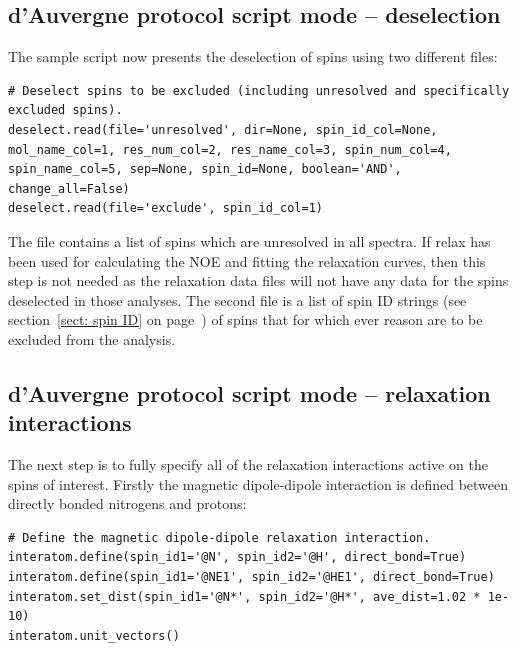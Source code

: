 \begin{htmlonly}
\begin{htmlonly}

\subsection{d'Auvergne protocol script mode -- deselection}

The sample script now presents the deselection of spins using two different files:

\begin{lstlisting}[firstnumber=188]
# Deselect spins to be excluded (including unresolved and specifically excluded spins).
deselect.read(file='unresolved', dir=None, spin_id_col=None, mol_name_col=1, res_num_col=2, res_name_col=3, spin_num_col=4, spin_name_col=5, sep=None, spin_id=None, boolean='AND', change_all=False)
deselect.read(file='exclude', spin_id_col=1)
\end{lstlisting}

The  file contains a list of spins which are unresolved in all spectra.  If relax has been used for calculating the NOE and fitting the relaxation curves, then this step is not needed as the relaxation data files will not have any data for the spins deselected in those analyses.  The second file  is a list of spin ID strings (see section~\ref{sect: spin ID} on page~\pageref{sect: spin ID}) of spins that for which ever reason are to be excluded from the analysis.



\subsection{d'Auvergne protocol script mode -- relaxation interactions}

The next step is to fully specify all of the relaxation interactions active on the spins of interest.  Firstly the magnetic dipole-dipole interaction is defined between directly bonded nitrogens and protons:

\begin{lstlisting}[firstnumber=192]
# Define the magnetic dipole-dipole relaxation interaction.
interatom.define(spin_id1='@N', spin_id2='@H', direct_bond=True)
interatom.define(spin_id1='@NE1', spin_id2='@HE1', direct_bond=True)
interatom.set_dist(spin_id1='@N*', spin_id2='@H*', ave_dist=1.02 * 1e-10)
interatom.unit_vectors()
\end{lstlisting}


\end{htmlonly}
\end{htmlonly}

